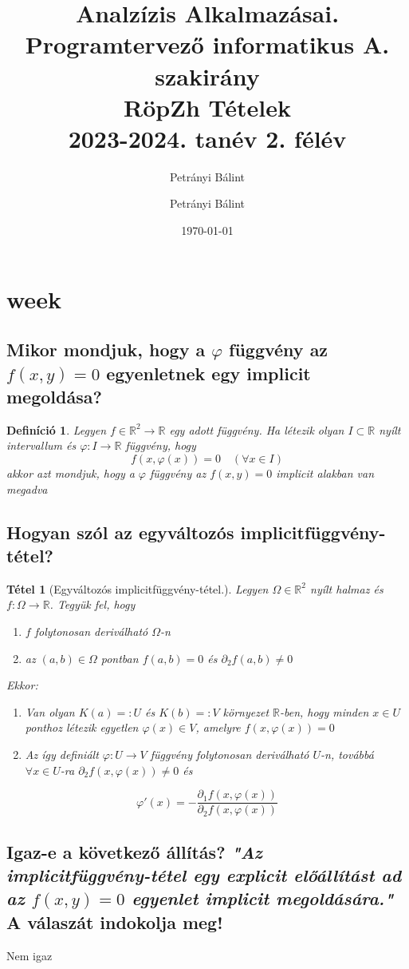 \documentclass[12pt,a4paper]{article}
\author{Petrányi Bálint}\usepackage[pdfusetitle]{hyperref}
\date{\today}
\author{Petrányi Bálint}
\title{%
	\textbf{Analzízis Alkalmazásai.} \\
	\textbf{Programtervező informatikus A. szakirány} \\
	RöpZh Tételek\\
	\large 2023-2024. tanév 2. félév
}
\newcommand{\R}{\mathbb{R}}
\newcommand{\f}{\varphi}
\newtheorem{tet}{Tétel}[section]
\newtheorem{defi}{Definíció}[section]
\begin{document}
\maketitle
\tableofcontents
\newpage
\section{week}
\subsection{Mikor mondjuk, hogy a $\f$ függvény az $f(x, y) = 0$ egyenletnek egy implicit megoldása?}
\begin{defi}
Legyen $f \in \R^2 \rightarrow \R$ egy adott függvény. Ha létezik olyan $I \subset \R$ nyílt intervallum és $\f : I \rightarrow \R$ függvény, hogy 
\[
f(x,\f(x)) = 0 \quad (\forall x \in I)
\]
akkor azt mondjuk, hogy a $\f$ függvény az $f(x, y) = 0$ implicit alakban van megadva
\end{defi}
\subsection{Hogyan szól az egyváltozós implicitfüggvény-tétel?}
\begin{tet}[Egyváltozós implicitfüggvény-tétel.]
Legyen $\Omega \in \R^2$ nyílt halmaz és $f : \Omega \rightarrow \R$. Tegyük fel, hogy
\begin{enumerate}
\item[(a)] $f$  folytonosan deriválható $\Omega$-n
\item[(b)] az $(a,b) \in \Omega$ pontban $f(a,b) = 0 $ és $\partial_2 f(a,b) \neq 0$
\end{enumerate}
Ekkor:
\begin{enumerate}
\item Van olyan $K(a) =: U$ és $K(b) =: V$ környezet $\R$-ben, hogy minden $x \in U$ ponthoz létezik egyetlen $\f(x) \in V$, amelyre $f(x, \f(x)) = 0$
\item Az így definiált $\f : U \rightarrow V$ függvény folytonosan deriválható $U$-n, továbbá $\forall x \in U$-ra  $\partial_2 f(x,\f(x)) \neq 0$ és
\end{enumerate}
\[
\f'(x) = - \frac{\partial_1 f (x,\f(x))}{\partial_2 f(x,\f(x))}
\]
\end{tet}
\subsection{Igaz-e a következő állítás? \textit{"Az implicitfüggvény-tétel egy explicit előállítást ad az $f(x, y) = 0$ egyenlet implicit megoldására."} A válaszát indokolja meg!}
Nem igaz
\end{document}
